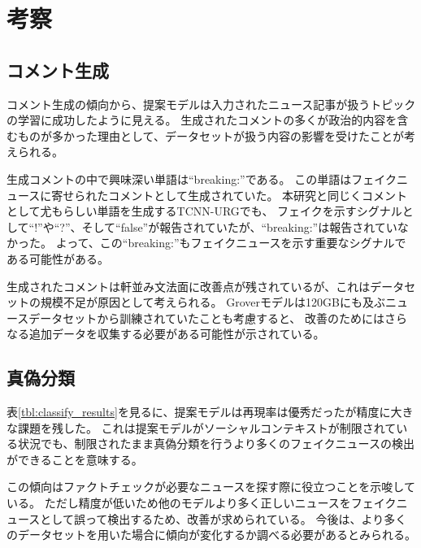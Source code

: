 \section{考察}
\subsection{コメント生成}
コメント生成の傾向から、提案モデルは入力されたニュース記事が扱うトピックの学習に成功したように見える。
生成されたコメントの多くが政治的内容を含むものが多かった理由として、データセットが扱う内容の影響を受けたことが考えられる。

生成コメントの中で興味深い単語は``breaking:''である。
この単語はフェイクニュースに寄せられたコメントとして生成されていた。
本研究と同じくコメントとして尤もらしい単語を生成するTCNN-URG\cite{ijcai2018-533}でも、
フェイクを示すシグナルとして``!''や``?''、そして``false''が報告されていたが、``breaking:''は報告されていなかった。
よって、この``breaking:''もフェイクニュースを示す重要なシグナルである可能性がある。

生成されたコメントは軒並み文法面に改善点が残されているが、これはデータセットの規模不足が原因として考えられる。
Groverモデルは120GBにも及ぶニュースデータセットから訓練されていた\cite{NIPS2019_9106}ことも考慮すると、
改善のためにはさらなる追加データを収集する必要がある可能性が示されている。

\subsection{真偽分類}
表\ref{tbl:classify_results}を見るに、提案モデルは再現率は優秀だったが精度に大きな課題を残した。
これは提案モデルがソーシャルコンテキストが制限されている状況でも、制限されたまま真偽分類を行うより多くのフェイクニュースの検出ができることを意味する。

この傾向はファクトチェックが必要なニュースを探す際に役立つことを示唆している。
ただし精度が低いため他のモデルより多く正しいニュースをフェイクニュースとして誤って検出するため、改善が求められている。
今後は、より多くのデータセットを用いた場合に傾向が変化するか調べる必要があるとみられる。
